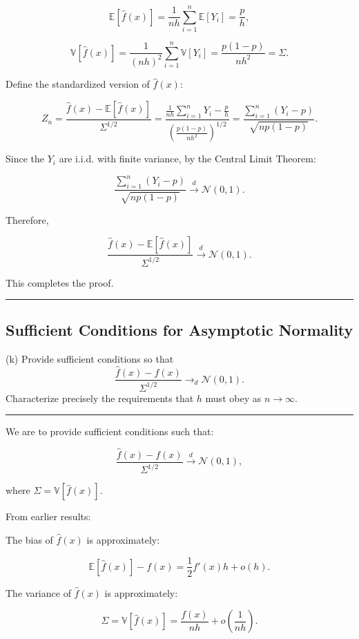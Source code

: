 \documentclass{article}
\newenvironment{colorparagraph}[1]{\par\color{#1}}{\par}
\begin{document}
\[
\mathbb{E}[\hat{f}(x)] = \frac{1}{n h} \sum_{i=1}^n \mathbb{E}[Y_i] = \frac{p}{h},
\]

\[
\mathbb{V}[\hat{f}(x)] = \frac{1}{(n h)^2} \sum_{i=1}^n \mathbb{V}[Y_i] = \frac{p (1 - p)}{n h^2} = \Sigma.
\]

Define the standardized version of \( \hat{f}(x) \):

\[
Z_n = \frac{\hat{f}(x) - \mathbb{E}[\hat{f}(x)]}{\Sigma^{1/2}} = \frac{\frac{1}{n h} \sum_{i=1}^n Y_i - \frac{p}{h}}{\left( \frac{p (1 - p)}{n h^2} \right)^{1/2}} = \frac{\sum_{i=1}^n (Y_i - p)}{\sqrt{n p (1 - p)}}.
\]

Since the \( Y_i \) are i.i.d. with finite variance, by the Central Limit Theorem:

\[
\frac{\sum_{i=1}^n (Y_i - p)}{\sqrt{n p (1 - p)}} \xrightarrow{d} \mathcal{N}(0, 1).
\]

Therefore,

\[
\frac{\hat{f}(x) - \mathbb{E}[\hat{f}(x)]}{\Sigma^{1/2}} \xrightarrow{d} \mathcal{N}(0, 1).
\]

This completes the proof.

\begin{colorparagraph}{questioncolor}
\label{q2k}
\rule{\textwidth}{0.5pt}
\subsection{Sufficient Conditions for Asymptotic Normality}
(k) Provide sufficient conditions so that
\[
\frac{\hat{f}(x) - f(x)}{\Sigma^{1/2}} \to_d \mathcal{N}(0, 1).
\]
Characterize precisely the requirements that \( h \) must obey as \( n \to \infty \).

\rule{\textwidth}{0.5pt}
\end{colorparagraph}

We are to provide sufficient conditions such that:

\[
\frac{\hat{f}(x) - f(x)}{\Sigma^{1/2}} \xrightarrow{d} \mathcal{N}(0, 1),
\]

where \(\Sigma = \mathbb{V}[\hat{f}(x)]\).

From earlier results:

The bias of \(\hat{f}(x)\) is approximately:

\[
\mathbb{E}[\hat{f}(x)] - f(x) = \frac{1}{2} f'(x) h + o(h).
\]

The variance of \(\hat{f}(x)\) is approximately:

\[
\Sigma = \mathbb{V}[\hat{f}(x)] = \frac{f(x)}{n h} + o\left( \frac{1}{n h} \right).
\]
\end{document}
